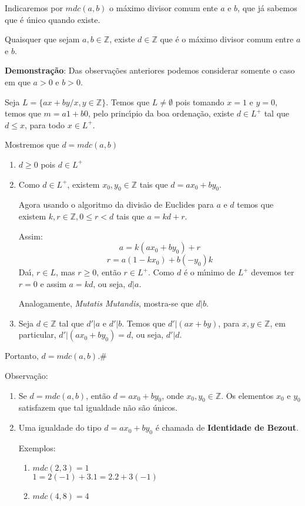 \begin{nota} Indicaremos por $mdc(a,b)$ o m{\'a}ximo divisor comum ente $a$ e $b$, que j{\'a} sabemos que {\'e} {\'u}nico quando existe.\end{nota}

\begin{proposicao} Quaisquer que sejam $a,b\in\mathbb{Z}$, existe $d\in\mathbb{Z}$ que {\'e} o m{\'a}ximo divisor comum entre $a$ e $b$.\end{proposicao}

\textbf{Demonstra{\c c}{\~a}o}: Das observa{\c c}{\~o}es anteriores podemos considerar somente o caso em que $a>0$ e $b>0$.

Seja $L=\{ax+by/x,y\in\mathbb{Z}\}$. Temos que $L\neq\emptyset$ pois tomando $x=1$ e $y=0$, temos que $m=a1+b0$, pelo princ{\'\i}pio da boa ordena{\c c}{\~a}o, existe $d\in L^{+}$ tal que $d\leq x$, para todo $x\in L^{+}$.

Mostremos que $d=mdc(a,b)$
\begin{enumerate}
\item $d\geq 0$ pois $d\in L^{+}$
\item Como $d\in L^{+}$, existem $x_{0},y_{0}\in\mathbb{Z}$ tais que $d=ax_{0}+by_{0}$.

Agora usando o algoritmo da divis{\~a}o de Euclides para $a$ e $d$ temos que existem $k,r\in\mathbb{Z},0\leq r<d$ tais que $a=kd+r$.

Assim:\[a=k(ax_{0}+by_{0})+r\] \[r=a(1-kx_{0})+b(-y_{0})k\] Da{\'\i}, $r\in L$, mas $r\geq 0$, ent{\~a}o $r\in L^{+}$. Como $d$ {\'e} o m{\'\i}nimo de $L^{+}$ devemos ter $r=0$ e assim $a=kd$, ou seja, $d|a$.

Analogamente, \textit{Mutatis Mutandis}, mostra-se que $d|b$.
\item Seja $d\in\mathbb{Z}$ tal que $d'|a$ e $d'|b$. Temos que $d'|(ax+by)$, para $x,y\in\mathbb{Z}$, em particular, $d'|(ax_{0}+by_{0})=d$, ou seja, $d'|d$.
\end{enumerate}

Portanto, $d=mdc(a,b)$.\#

Observa{\c c}{\~a}o:
\begin{enumerate}
\item Se $d=mdc(a,b)$, ent{\~a}o $d=ax_{0}+by_{0}$, onde $x_{0},y_{0}\in\mathbb{Z}$. Os elementos $x_{0}$ e $y_{0}$ satisfazem que tal igualdade n{\~a}o s\~ao {\'u}nicos.
\item Uma igualdade do tipo $d=ax_{0}+by_{0}$ {\'e} chamada de \textbf{Identidade de Bezout}.

Exemplos:
\begin{enumerate}
\item $mdc(2,3)=1$\\
$1=2(-1)+3.1=2.2+3(-1)$
\item $mdc(4,8)=4$\\
\end{enumerate}
\end{enumerate}

